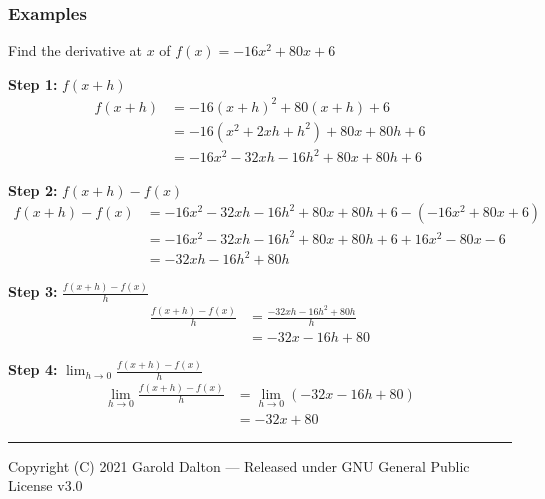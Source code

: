 \documentclass[14pt]{extarticle}
\begin{document}
\subsubsection{Examples}
Find the derivative at $x$ of $f(x) = -16x^2 +80x+6$

\textbf{Step 1:} $f(x+h)$
\begin{align*}
	f(x+h) & = -16(x+h)^2 + 80(x+h) + 6 \\
	&= -16(x^2 + 2xh+h^2) + 80x + 80h + 6 \\
	&= -16x^2 -32xh -16h^2 + 80x + 80h + 6 
\end{align*}

\textbf{Step 2:} $f(x+h) - f(x)$
\begin{align*}
	f(x+h)-f(x) &= -16x^2 -32xh -16h^2 + 80x + 80h + 6 - (-16x^2 +80x+6) \\
	&= -16x^2 -32xh -16h^2 + 80x + 80h + 6 +16x^2 -80x -6 \\
	&= -32xh -16h^2 +80h
\end{align*}

\textbf{Step 3:} $\frac{f(x+h) - f(x)}{h}$
\begin{align*}
	\frac{f(x+h) - f(x)}{h} &= \frac{-32xh -16h^2 +80h}{h} \\
	&= -32x -16h +80
\end{align*}

\textbf{Step 4:} $\lim_{h\to 0}\frac{f(x+h) - f(x)}{h}$
\begin{align*}
	\lim_{h\to 0}\frac{f(x+h) - f(x)}{h} &= \lim_{h\to 0}(-32x -16h +80) \\
	&= -32x  +80
\end{align*}



\noindent\rule{\textwidth}{1pt}
{\footnotesize Copyright (C) 2021 Garold Dalton --- Released under GNU General Public License v3.0}


\cleardoublepage
\end{document}
